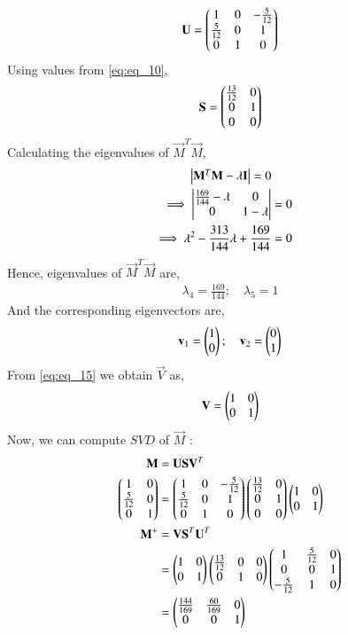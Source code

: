\documentclass[journal,12pt,twocolumn]{IEEEtran}
\begin{document}
\begin{align} \label{eq:eq_13}
    \mathbf{U} = \begin{pmatrix}1 & 0 & -\frac{5}{12} \\ \frac{5}{12} & 0 & 1 \\ 0 & 1 & 0\end{pmatrix}
\end{align}
Using values from \eqref{eq:eq_10},
\begin{align} \label{eq:eq_14}
    \mathbf{S} = \begin{pmatrix}\frac{13}{12} & 0 \\ 0 & 1 \\ 0 & 0\end{pmatrix} 
\end{align}
Calculating the eigenvalues of $\vec{M}^T\vec{M}$,
\begin{align}
    \begin{vmatrix}\mathbf{M}^T\mathbf{M} - \lambda \mathbf{I}\end{vmatrix} = 0 \nonumber \\
    \implies \begin{vmatrix}\frac{169}{144}-\lambda & 0 \\ 0 & 1-\lambda\end{vmatrix} &= 0 \nonumber \\
    \implies \lambda^2 - \frac{313}{144}\lambda + \frac{169}{144} &= 0 \nonumber
\end{align}
Hence, eigenvalues of $\vec{M}^T\vec{M}$ are,
\begin{align}
    \lambda_4 = \frac{169}{144}; \quad \lambda_5 = 1 \nonumber
\end{align}
And the corresponding eigenvectors are,
\begin{align}
    \mathbf{v}_1 = \begin{pmatrix}1 \\ 0\end{pmatrix}; \quad 
    \mathbf{v}_2 = \begin{pmatrix}0 \\ 1\end{pmatrix} \label{eq:eq_15}
\end{align}
From \eqref{eq:eq_15} we obtain $\vec{V}$ as,
\begin{align} \label{eq:eq_16}
    \mathbf{V} = \begin{pmatrix}1 & 0 \\ 0 & 1\end{pmatrix}
\end{align}
Now, we can compute $\textit{SVD}$ of $\vec{M}$ :
\begin{align}
	\label{eq16}\vec{M} &= \vec{U}\Vec{S}\vec{V}^T\\
	\label{eq17}\myvec{1 & 0\\\frac{5}{12} & 0 \\0 & 1} &= \myvec{1 & 0 & -\frac{5}{12}\\ \frac{5}{12} & 0 & 1 \\0 & 1 & 0}\myvec{\frac{13}{12} & 0 \\0 & 1\\0 & 0} \myvec{1 & 0\\0 & 1}\\
	\label{eq18}\vec{M}^{+} &= \vec{V}\Vec{S}^T\vec{U}^T\\
	\label{eq19}&= \myvec{1 & 0\\0 & 1}\myvec{\frac{13}{12} & 0 & 0\\0 & 1 & 0}\myvec{1 & \frac{5}{12} & 0\\ 0 & 0 & 1 \\-\frac{5}{12} & 1 & 0}\\
	\label{eq20}&=\myvec{\frac{144}{169} & \frac{60}{169} & 0\\0 & 0 & 1}
\end{align}
\end{document}

